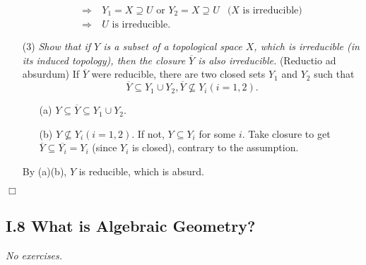 \documentclass{article}
\begin{document}
\begin{enumerate}
\begin{align*}
  \Longrightarrow& \:
  Y_1 = X \supseteq U \text{ or } Y_2 = X \supseteq U
    &\text{($X$ is irreducible)} \\
  \Longrightarrow& \:
  \text{$U$ is irreducible.}
  \end{align*}
\item[(3)]
\emph{Show that if $Y$ is a subset of a topological space $X$,
which is irreducible (in its induced topology),
then the closure $\overline{Y}$ is also irreducible.}
(Reductio ad absurdum)
If $\overline{Y}$ were reducible, there are two closed sets $Y_1$ and $Y_2$
such that
$$\overline{Y} \subseteq Y_1 \cup Y_2,
\overline{Y} \not\subseteq Y_i (i = 1, 2).$$
  \begin{enumerate}
  \item[(a)]
  $Y \subseteq \overline{Y} \subseteq Y_1 \cup Y_2$.
  \item[(b)]
  $Y\not\subseteq Y_i (i = 1, 2)$. If not, $Y \subseteq Y_i$ for some $i$.
  Take closure to get $\overline{Y} \subseteq \overline{Y_i} = Y_i$ (since $Y_i$ is closed),
  contrary to the assumption.
  \end{enumerate}
  By (a)(b), $Y$ is reducible, which is absurd.
\end{enumerate}
$\Box$ \\






\subsection*{I.8 What is Algebraic Geometry? \\}



\emph{No exercises.} \\\\



\end{document}
